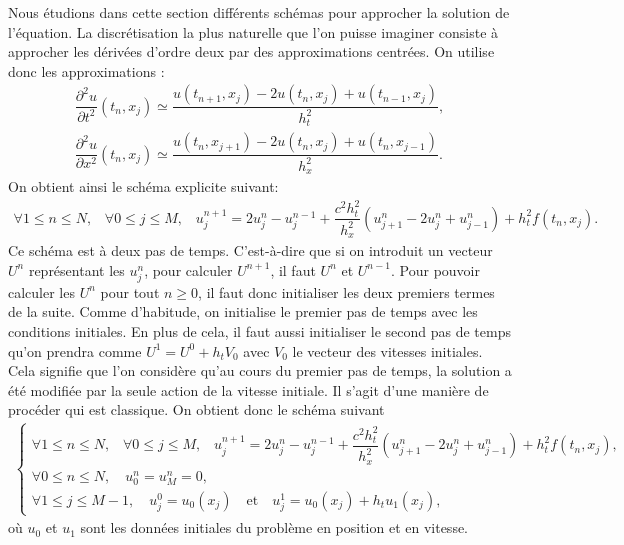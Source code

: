 \documentclass[12pt,a4paper,twoside]{article}
\begin{document}
Nous \'etudions dans cette section diff\'erents sch\'emas pour approcher la solution
de l'\'equation.
La discr\'etisation la plus naturelle que l'on puisse imaginer
consiste \`a approcher les d\'eriv\'ees d'ordre deux par des approximations centr\'ees.
On utilise donc les approximations :
\begin{align*}
  \dfrac{\partial^2 u}{\partial t^2}(t_n,x_j) \simeq 
  \dfrac{u(t_{n+1},x_j) - 2 u(t_n,x_j) + u(t_{n-1},x_j)}{h_t^2} ,
  \\
  \dfrac{\partial^2 u}{\partial x^2}(t_n,x_j) \simeq 
  \dfrac{u(t_n,x_{j+1}) - 2 u(t_n,x_{j}) + u(t_n,x_{j-1})}{h_x^2} .
\end{align*}
On obtient ainsi le sch\'ema explicite suivant:
\begin{align*}
  \forall 1 \leq n \leq N, \;\;\; \forall 0 \leq j \leq M, \;\;\;
  u_j^{n+1} = 2 u_j^{n} - u_j^{n-1} + \dfrac{c^2 h_t^2}{h_x^2} (u_{j+1}^{n} - 2 u_{j}^{n}+u_{j-1}^{n})
  + h_t^2 f(t_n, x_j) .
\end{align*}
Ce sch\'ema est \`a deux pas de temps.
C'est-\`a-dire que si on introduit un vecteur $U^n$ repr\'esentant les $u_j^n$, 
pour calculer $U^{n+1}$, il faut $U^n$ et $U^{n-1}$.
Pour pouvoir calculer les $U^n$ pour tout $n \geq 0$, il faut donc
initialiser les deux premiers termes de la suite.
Comme d'habitude, on initialise le premier pas de temps avec les conditions initiales.
En plus de cela, il faut aussi initialiser le second pas de temps qu'on prendra comme
$U^{1} = U^0 + h_t V_0$ avec $V_0$ le vecteur des vitesses initiales.
Cela signifie que l'on consid\`ere qu'au cours du premier pas de temps,
la solution a \'et\'e modifi\'ee par la seule action de la vitesse initiale.
Il s'agit d'une mani\`ere de proc\'eder qui est classique.
On obtient donc le sch\'ema suivant
\begin{align}
  \label{eq:ondes_DF_exp}
  \left\{
  \begin{array}{l}
    \forall 1 \leq n \leq N, \;\;\; \forall 0 \leq j \leq M, \;\;\;
    u_j^{n+1} = 2 u_j^{n} - u_j^{n-1} + \dfrac{c^2 h_t^2}{h_x^2} (u_{j+1}^{n} - 2 u_{j}^{n}+u_{j-1}^{n})
    + h_t^2 f(t_n, x_j) ,
    \\
    \forall 0 \leq n \leq N , \quad
    u_0^n = u_M^n = 0 ,
    \\
    \forall 1 \leq j \leq M-1 ,  \quad
    u_j^0 = u_0(x_j) \quad \text{et} \quad u_j^1 = u_0(x_j) + h_t u_1(x_j) ,
  \end{array}
  \right.
\end{align}
o\`u $u_0$ et $u_1$ sont les donn\'ees initiales du probl\`eme
en position et en vitesse.
\end{document}
